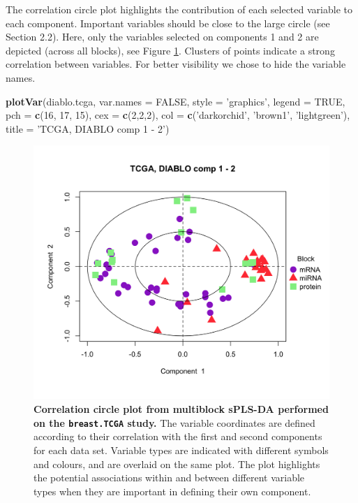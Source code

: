 \documentclass[]{book}
\newenvironment{Shaded}{\begin{snugshade}}{\end{snugshade}}
\newcommand{\DataTypeTok}[1]{\textcolor[rgb]{0.13,0.29,0.53}{#1}}
\newcommand{\DecValTok}[1]{\textcolor[rgb]{0.00,0.00,0.81}{#1}}
\newcommand{\KeywordTok}[1]{\textcolor[rgb]{0.13,0.29,0.53}{\textbf{#1}}}
\newcommand{\NormalTok}[1]{#1}
\newcommand{\OtherTok}[1]{\textcolor[rgb]{0.56,0.35,0.01}{#1}}
\newcommand{\StringTok}[1]{\textcolor[rgb]{0.31,0.60,0.02}{#1}}
\begin{document}
The correlation circle plot highlights the contribution of each selected variable to each component. Important variables should be close to the large circle (see Section 2.2). Here, only the variables selected on components 1 and 2 are depicted (across all blocks), see Figure \ref{fig:diablo-plotvar}. Clusters of points indicate a strong correlation between variables. For better visibility we chose to hide the variable names.

\begin{Shaded}
\begin{Highlighting}[]
\KeywordTok{plotVar}\NormalTok{(diablo.tcga, }\DataTypeTok{var.names =} \OtherTok{FALSE}\NormalTok{, }\DataTypeTok{style =} \StringTok{'graphics'}\NormalTok{, }\DataTypeTok{legend =} \OtherTok{TRUE}\NormalTok{, }
        \DataTypeTok{pch =} \KeywordTok{c}\NormalTok{(}\DecValTok{16}\NormalTok{, }\DecValTok{17}\NormalTok{, }\DecValTok{15}\NormalTok{), }\DataTypeTok{cex =} \KeywordTok{c}\NormalTok{(}\DecValTok{2}\NormalTok{,}\DecValTok{2}\NormalTok{,}\DecValTok{2}\NormalTok{), }
        \DataTypeTok{col =} \KeywordTok{c}\NormalTok{(}\StringTok{'darkorchid'}\NormalTok{, }\StringTok{'brown1'}\NormalTok{, }\StringTok{'lightgreen'}\NormalTok{),}
        \DataTypeTok{title =} \StringTok{'TCGA, DIABLO comp 1 - 2'}\NormalTok{)}
\end{Highlighting}
\end{Shaded}

\begin{figure}

{\centering \includegraphics[width=0.5\linewidth]{Figures/DIABLO/diablo-plotvar-1} 

}

\caption{\textbf{Correlation circle plot from multiblock sPLS-DA performed on the \texttt{breast.TCGA} study.} The variable coordinates are defined according to their correlation with the first and second components for each data set. Variable types are indicated with different symbols and colours, and are overlaid on the same plot. The plot highlights the potential associations within and between different variable types when they are important in defining their own component.}\label{fig:diablo-plotvar}
\end{figure}
\end{document}
